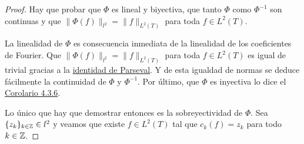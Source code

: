 \documentclass[a4paper, 11pt, oneside]{report}
\begin{document}
\begin{proof}
  Hay que probar que $\Phi$ es lineal y biyectiva, que tanto $\Phi$ como $\Phi^{-1}$ son continuas y que $\|\Phi(f)\|_{l^2} = \|f\|_{L^2(T)}$ para toda $f \in L^2(T)$. 

  La linealidad de $\Phi$ es consecuencia inmediata de la linealidad de los coeficientes de Fourier. Que $\|\Phi(f)\|_{l^2} = \|f\|_{L^2(T)}$ para toda $f \in L^2(T)$ es igual de trivial gracias a la \hyperref[teo:4.5.1]{\color{c1}identidad de Parseval}. Y de esta igualdad de normas se deduce fácilmente la continuidad de $\Phi$ y $\Phi^{-1}$. Por último, que $\Phi$ es inyectiva lo dice el \hyperref[cor:4.3.6]{\color{c1}Corolario 4.3.6}.

  Lo único que hay que demostrar entonces es la sobreyectividad de $\Phi$. Sea $\{z_k\}_{k \in \mathbb Z} \in l^2$ y veamos que existe $f \in L^2(T)$ tal que $c_k(f) = z_k$ para todo $k \in \mathbb Z$.


\end{proof}
\end{document}
